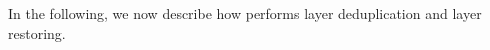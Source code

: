 In the following, we now describe how \sysname performs layer deduplication and layer restoring.

%
%

%
%
%
%
